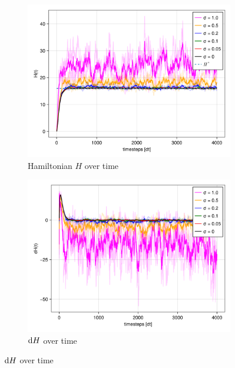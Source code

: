 \begin{itemize}
    \begin{figure}[H]
        \centering
        \begin{subfigure}{.49\textwidth}
            \centering
            \includegraphics[width=\linewidth]{figures/ch5_basic_stoch/H_stochasic_nointeraction.png}
            \caption{Hamiltonian $H$ over time}
            \label{plot:stoc_nointeraction_h}
        \end{subfigure}
        \begin{subfigure}{.49\textwidth}
            \centering
            \includegraphics[width=\linewidth]{figures/ch5_basic_stoch/dH_stochasic_nointeraction.png}
            \caption{$\mathrm d H$ over time}
            \label{plot:stoc_nointeraction_dh}

\end{subfigure}
\end{figure}
\end{itemize}
